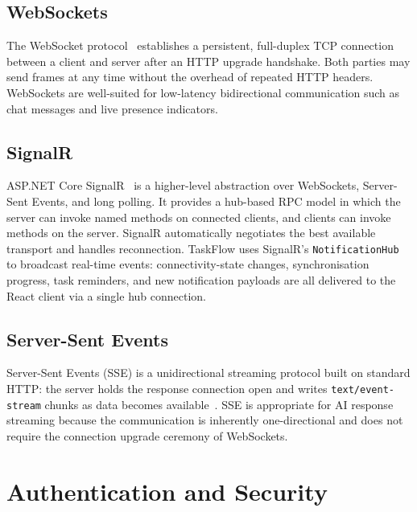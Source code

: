 \subsection*{WebSockets}

The WebSocket protocol~\cite{rfc6455} establishes a persistent, full-duplex TCP
connection between a client and server after an HTTP upgrade handshake.
Both parties may send frames at any time without the overhead of repeated HTTP headers.
WebSockets are well-suited for low-latency bidirectional communication such as chat
messages and live presence indicators.

\subsection*{SignalR}

ASP.NET Core SignalR~\cite{signalrdocs2024} is a higher-level abstraction over
WebSockets, Server-Sent Events, and long polling.
It provides a hub-based RPC model in which the server can invoke named methods on
connected clients, and clients can invoke methods on the server.
SignalR automatically negotiates the best available transport and handles reconnection.
TaskFlow uses SignalR's \texttt{NotificationHub} to broadcast real-time events:
connectivity-state changes, synchronisation progress, task reminders, and new
notification payloads are all delivered to the React client via a single hub connection.

\subsection*{Server-Sent Events}

Server-Sent Events (SSE) is a unidirectional streaming protocol built on standard
HTTP: the server holds the response connection open and writes \texttt{text/event-stream}
chunks as data becomes available~\cite{signalrdocs2024}.
SSE is appropriate for AI response streaming because the communication is
inherently one-directional and does not require the connection upgrade
ceremony of WebSockets.

\section{Authentication and Security}\label{sec:bg_security}

